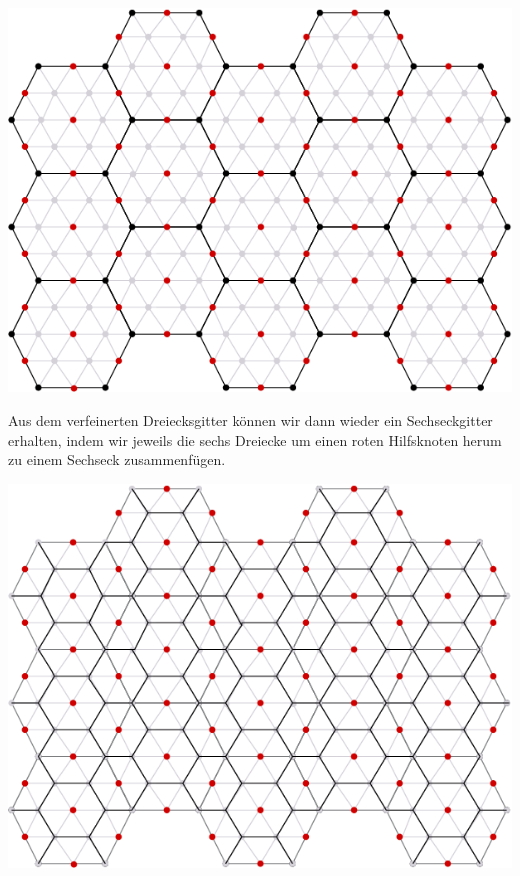 \documentclass[a4paper,10pt]{scrartcl}
\begin{document}
\begin{enumerate}[1.]
\begin{center}
\includegraphics[scale=0.25]{cg2_ex4_4-3.png}\\
\end{center}
Aus dem verfeinerten Dreiecksgitter k\"onnen wir dann wieder ein Sechseckgitter erhalten, indem wir jeweils die sechs Dreiecke um einen roten Hilfsknoten herum zu einem Sechseck zusammenf\"ugen.
\begin{center}
\includegraphics[scale=0.25]{cg2_ex4_4-4.png}\\
\end{center}

\end{enumerate}
\end{document}
